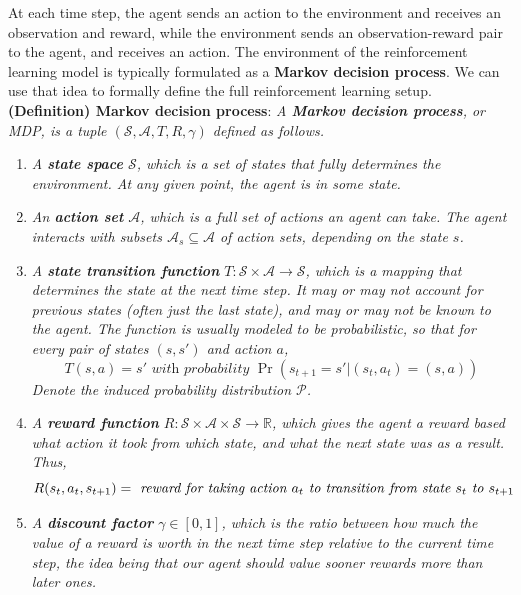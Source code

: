 \documentclass{article}
\begin{document}
At each time step, the agent sends an action to the environment and receives an observation and reward, while the environment sends an observation-reward pair to the agent, and receives an action.
\newline \newline
The environment of the reinforcement learning model is typically formulated as a \textbf{Markov decision process}. We can use that idea to formally define the full reinforcement learning setup.
\newline \newline
\textbf{(Definition) Markov decision process}: \textit{A \textbf{Markov decision process}, or MDP, is a tuple $ (\mathcal{S}, \mathcal{A}, T, R, \gamma) $ defined as follows.}
\begin{enumerate}
    \item \textit{A \textbf{state space} $ \mathcal{S} $, which is a set of states that fully determines the environment. At any given point, the agent is in some state.}
    \item \textit{An \textbf{action set} $ \mathcal{A} $, which is a full set of actions an agent can take. The agent interacts with subsets $ \mathcal{A}_s \subseteq \mathcal{A} $ of action sets, depending on the state $ s $.}
    \item \textit{A \textbf{state transition function} $ T: \mathcal{S} \times \mathcal{A} \rightarrow \mathcal{S} $, which is a mapping that determines the state at the next time step. It may or may not account for previous states (often just the last state), and may or may not be known to the agent. The function is usually modeled to be probabilistic, so that for every pair of states $ (s, s') $ and action $ a $,}
        $$ T(s, a) = s' \textit{ with probability } \Pr(s_{t + 1} = s' | (s_t, a_t) = (s, a)) $$
    \textit{Denote the induced probability distribution $ \mathcal{P} $.}
    \item \textit{A \textbf{reward function} $ R: \mathcal{S} \times \mathcal{A} \times \mathcal{S} \rightarrow \mathbb{R} $, which gives the agent a reward based what action it took from which state, and what the next state was as a result. Thus,}
        $$ R(s_t, a_t, s_{t + 1}) = \textit{ reward for taking action $ a_t $ to transition from state $ s_t $ to $ s_{t + 1} $ } $$
    \item \textit{A \textbf{discount factor} $ \gamma \in [0, 1] $, which is the ratio between how much the value of a reward is worth in the next time step relative to the current time step, the idea being that our agent should value sooner rewards more than later ones.}
\end{enumerate}
\end{document}
